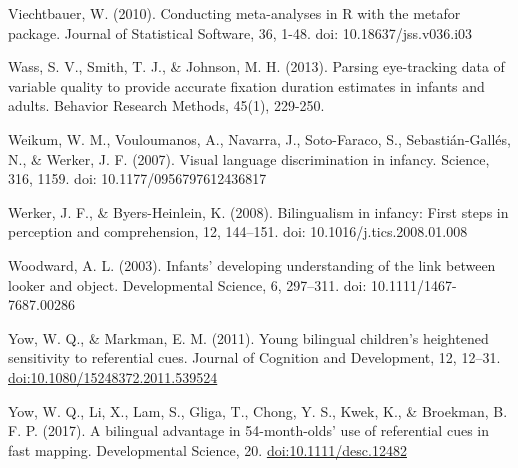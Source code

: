 \documentclass[,man,floatsintext]{apa6}
\begin{document}
Viechtbauer, W. (2010). Conducting meta-analyses in R with the metafor package. Journal of Statistical Software, 36, 1-48. doi: 10.18637/jss.v036.i03

Wass, S. V., Smith, T. J., \& Johnson, M. H. (2013). Parsing eye-tracking data of variable quality to provide accurate fixation duration estimates in infants and adults. Behavior Research Methods, 45(1), 229-250.

Weikum, W. M., Vouloumanos, A., Navarra, J., Soto-Faraco, S., Sebastián-Gallés, N., \& Werker, J. F. (2007). Visual language discrimination in infancy. Science, 316, 1159. doi: 10.1177/0956797612436817

Werker, J. F., \& Byers-Heinlein, K. (2008). Bilingualism in infancy: First steps in perception and comprehension, 12, 144--151. doi: 10.1016/j.tics.2008.01.008

Woodward, A. L. (2003). Infants' developing understanding of the link between looker and object. Developmental Science, 6, 297--311. doi: 10.1111/1467-7687.00286

Yow, W. Q., \& Markman, E. M. (2011). Young bilingual children's heightened sensitivity to referential cues. Journal of Cognition and Development, 12, 12--31. \url{doi:10.1080/15248372.2011.539524}

Yow, W. Q., Li, X., Lam, S., Gliga, T., Chong, Y. S., Kwek, K., \& Broekman, B. F. P. (2017). A bilingual advantage in 54-month-olds' use of referential cues in fast mapping. Developmental Science, 20. \url{doi:10.1111/desc.12482}

\begingroup
\setlength{\parindent}{-0.5in}
\setlength{\leftskip}{0.5in}

\hypertarget{refs}{}

\endgroup
\end{document}
